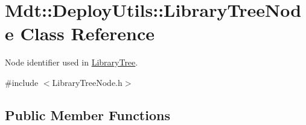 \hypertarget{class_mdt_1_1_deploy_utils_1_1_library_tree_node}{}\section{Mdt\+:\+:Deploy\+Utils\+:\+:Library\+Tree\+Node Class Reference}
\label{class_mdt_1_1_deploy_utils_1_1_library_tree_node}


Node identifier used in \hyperlink{class_mdt_1_1_deploy_utils_1_1_library_tree}{Library\+Tree}.  




{\ttfamily \#include $<$Library\+Tree\+Node.\+h$>$}

\subsection*{Public Member Functions}
